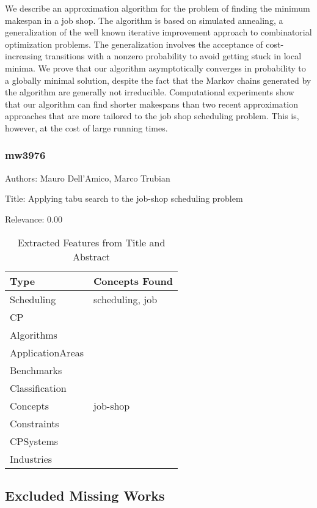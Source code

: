   We describe an approximation algorithm for the problem of finding the minimum makespan in a job shop. The algorithm is based on simulated annealing, a generalization of the well known iterative improvement approach to combinatorial optimization problems. The generalization involves the acceptance of cost-increasing transitions with a nonzero probability to avoid getting stuck in local minima. We prove that our algorithm asymptotically converges in probability to a globally minimal solution, despite the fact that the Markov chains generated by the algorithm are generally not irreducible. Computational experiments show that our algorithm can find shorter makespans than two recent approximation approaches that are more tailored to the job shop scheduling problem. This is, however, at the cost of large running times.  

\subsubsection{mw3976}
\label{mw:mw3976}

Authors: Mauro Dell'Amico, Marco Trubian

Title: Applying tabu search to the job-shop scheduling problem

Relevance:  0.00

{\scriptsize
\begin{longtable}{p{2cm}p{20cm}}
\caption{Extracted Features from Title and Abstract}\\ \toprule
Type & Concepts Found\\ \midrule
\endhead
\bottomrule
\endfoot
Scheduling & scheduling, job\\ 
CP & \\ 
Algorithms & \\ 
ApplicationAreas & \\ 
Benchmarks & \\ 
Classification & \\ 
Concepts & job-shop\\ 
Constraints & \\ 
CPSystems & \\ 
Industries & \\ 
\end{longtable}
}



\subsection{Excluded Missing Works}

